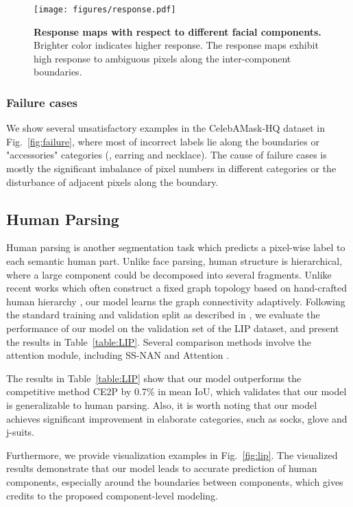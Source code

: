 \begin{figure*}[htbp]
    \centering
    \texttt{[image: figures/response.pdf]}
    \caption{\textbf{Response maps with respect to different facial components.} Brighter color indicates higher response. The response maps exhibit high response to ambiguous pixels along the inter-component boundaries.}
    \label{fig:response_vis}
\end{figure*}

\subsubsection{Failure cases}
We show several unsatisfactory examples in the CelebAMask-HQ dataset in Fig.~\ref{fig:failure}, where most of incorrect labels lie along the boundaries or "accessories" categories (\eg, earring and necklace). The cause of failure cases is mostly the significant imbalance of pixel numbers in different categories or the disturbance of adjacent pixels along the boundary.

\subsection{Human Parsing}
Human parsing is another segmentation task which predicts a pixel-wise label to each semantic human part. 
Unlike face parsing, human structure is hierarchical, where a large component could be decomposed into several fragments. 
Unlike recent works which often construct a fixed graph topology based on hand-crafted human hierarchy \cite{liu2019braid,wang2019learning,wang2020learning}, our model learns the graph connectivity adaptively. 
Following the standard training and validation split as described in \cite{ruan2019devil}, we evaluate the performance of our model on the validation set of the LIP dataset, and present the results in Table~\ref{table:LIP}.
Several comparison methods involve the attention module, including SS-NAN \cite{zhao2017self} and Attention \cite{chen2016attention}. 


The results in Table~\ref{table:LIP} show that our model outperforms the competitive method CE2P \cite{ruan2019devil} by 0.7\% in mean IoU, which validates that our model is generalizable to human parsing. 
Also, it is worth noting that our model achieves significant improvement in elaborate categories, such as socks, glove and j-suits.

Furthermore, we provide visualization examples in Fig.~\ref{fig:lip}. 
The visualized results demonstrate that our model leads to accurate prediction of human components, especially around the boundaries between components, which gives credits to the proposed component-level modeling.  
